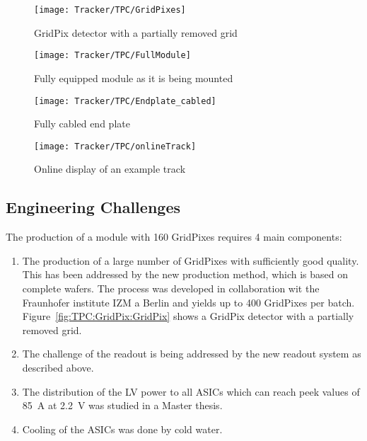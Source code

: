 \begin{figure}
	\begin{minipage}{.49\textwidth}
		\texttt{[image: Tracker/TPC/GridPixes]}
		\caption{GridPix detector with a partially removed grid}
		\label{fig:TPC:GridPix:GridPix}
	\end{minipage}
	\hfill
	\begin{minipage}{.49\textwidth}
		\texttt{[image: Tracker/TPC/FullModule]}
		\caption{Fully equipped module as it is being mounted}
		\label{fig:TPC:GridPix:module}
	\end{minipage}
\end{figure}

\begin{figure}
	\begin{minipage}{.49\textwidth}
		\texttt{[image: Tracker/TPC/Endplate\_cabled]}
		\caption{Fully cabled end plate}
		\label{fig:TPC:GridPix:endPlate}
	\end{minipage}
	\hfill
	\begin{minipage}{.49\textwidth}
		\texttt{[image: Tracker/TPC/onlineTrack]}
		\caption{Online display of an example track}
		\label{fig:TPC:GridPix:onlineTrack}
	\end{minipage}
\end{figure}

\subsection{Engineering Challenges}
The production of a module with 160 GridPixes requires 4 main components:
\begin{enumerate}
	\item The production of a large number of GridPixes with sufficiently good quality. This has been addressed by the new production method, which is based on complete wafers. The process was developed in collaboration wit the Fraunhofer institute IZM a Berlin and yields up to 400 GridPixes per batch. Figure~\ref{fig:TPC:GridPix:GridPix} shows a GridPix detector with a partially removed grid.
	\item The challenge of the readout is being addressed by the new readout system as described above.
	\item The distribution of the LV power to all ASICs which can reach peek values of \SI{85}{A} at \SI{2.2}{V} was studied in a Master thesis.
	\item Cooling of the ASICs was done by cold water.
\end{enumerate}


